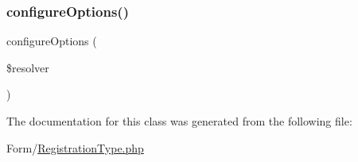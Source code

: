 \mbox{\label{class_app_1_1_form_1_1_registration_type_a8ff68a86f5090b5df973286836e46ead}} 
\subsubsection{\texorpdfstring{configureOptions()}{configureOptions()}}
{\footnotesize\ttfamily configure\+Options (\begin{DoxyParamCaption}\item[{Options\+Resolver}]{\$resolver }\end{DoxyParamCaption})}



The documentation for this class was generated from the following file\+:\begin{DoxyCompactItemize}
\item 
Form/\mbox{\hyperlink{_registration_type_8php}{Registration\+Type.\+php}}\end{DoxyCompactItemize}

